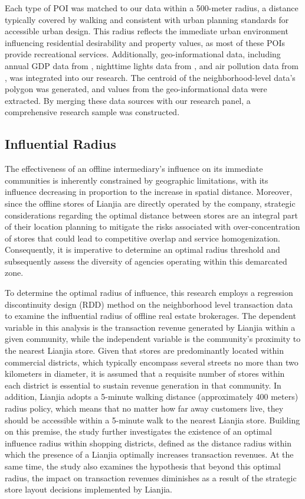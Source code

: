 \documentclass[11pt]{article}
\begin{document}
Each type of POI was matched to our data within a 500-meter radius, a distance typically covered by walking and consistent with urban planning standards for accessible urban design. This radius reflects the immediate urban environment influencing residential desirability and property values, as most of these POIs provide recreational services. Additionally, geo-informational data, including annual GDP data from \citet{zhao_forecasting_2017}, nighttime lights data from \citet{elvidge_annual_2021}, and air pollution data from \citet{doi:10.1021/acs.est.1c05309}, was integrated into our research. The centroid of the neighborhood-level data's polygon was generated, and values from the geo-informational data were extracted. By merging these data sources with our research panel, a comprehensive research sample was constructed.

\subsection{Influential Radius} \label{subsec:Influential_Radius}

The effectiveness of an offline intermediary's influence on its immediate communities is inherently constrained by geographic limitations, with its influence decreasing in proportion to the increase in spatial distance. Moreover, since the offline stores of Lianjia are directly operated by the company, strategic considerations regarding the optimal distance between stores are an integral part of their location planning to mitigate the risks associated with over-concentration of stores that could lead to competitive overlap and service homogenization. Consequently, it is imperative to determine an optimal radius threshold and subsequently assess the diversity of agencies operating within this demarcated zone.

To determine the optimal radius of influence, this research employs a regression discontinuity design (RDD) method on the neighborhood level transaction data to examine the influential radius of offline real estate brokerages. The dependent variable in this analysis is the transaction revenue generated by Lianjia within a given community, while the independent variable is the community's proximity to the nearest Lianjia store. Given that stores are predominantly located within commercial districts, which typically encompass several streets no more than two kilometers in diameter, it is assumed that a requisite number of stores within each district is essential to sustain revenue generation in that community. In addition, Lianjia adopts a 5-minute walking distance (approximately 400 meters) radius policy, which means that no matter how far away customers live, they should be accessible within a 5-minute walk to the nearest Lianjia store. Building on this premise, the study further investigates the existence of an optimal influence radius within shopping districts, defined as the distance radius within which the presence of a Lianjia optimally increases transaction revenues. At the same time, the study also examines the hypothesis that beyond this optimal radius, the impact on transaction revenues diminishes as a result of the strategic store layout decisions implemented by Lianjia.
\end{document}
